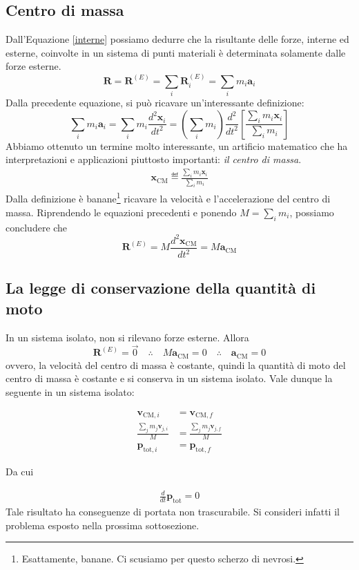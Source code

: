 \subsection{Centro di massa}
Dall'Equazione \ref{interne} possiamo dedurre che la risultante delle
forze, interne ed esterne, coinvolte in un sistema di punti materiali
è determinata solamente dalle forze esterne.
\[ \mathbf{R} = \mathbf{R}^{(E)} = \sum_{i} \mathbf{R}^{(E)}_i = \sum_i m_i\mathbf{a}_i \]
Dalla precedente equazione, si può ricavare un'interessante definizione:
\[ \sum_i m_i\mathbf{a}_i = \sum_i m_i \frac{d^2\mathbf{x}_i}{dt^2} = \left(\sum_i m_i\right) \frac{d^2}{dt^2}\left[ \frac{\sum_i m_i\mathbf{x}_i}{\sum_i m_i} \right] \]
Abbiamo ottenuto un termine molto interessante, un artificio matematico
che ha interpretazioni e applicazioni piuttosto importanti: \textit{il
centro di massa}.
\begin{align}
    \mathbf{x}_\text{CM} \eqdef \frac{\sum_i m_i\mathbf{x}_i}{\sum_i m_i}
\end{align}
Dalla definizione è banane\footnote{Esattamente, banane. Ci scusiamo per questo scherzo di nevrosi.} ricavare la velocità e l'accelerazione del
centro di massa. Riprendendo le equazioni precedenti e ponendo $M = \sum_i m_i$,
possiamo concludere che
\[ \mathbf{R}^{(E)} = M\frac{d^2\mathbf{x}_\text{CM}}{dt^2} = M\mathbf{a}_\text{CM} \]

\subsection{La legge di conservazione della quantità di moto}
In un sistema isolato, non si rilevano forze esterne. Allora
\[ \mathbf{R}^{(E)} = \overrightarrow{0} \quad \therefore \quad M\mathbf{a}_\text{CM} = 0 \quad \therefore \quad \mathbf{a}_\text{CM} = 0 \]
ovvero, la velocità del centro di massa è costante, quindi la
quantità di moto del centro di massa è costante e si conserva in
un sistema isolato. Vale dunque la seguente in un sistema isolato:

\begin{align*}
    \mathbf{v}_{\text{CM}, i} &= \mathbf{v}_{\text{CM}, f}\\
    \frac{\sum_j m_j\mathbf{v}_{j,i}}{M} &= \frac{\sum_j m_j\mathbf{v}_{j,f}}{M}\\
    \mathbf{p}_{\text{tot}, i} &= \mathbf{p}_{\text{tot}, f}
\end{align*}

\noindent Da cui

\begin{align}
    \frac{d}{dt}\mathbf{p}_\text{tot} = 0
\end{align}
Tale risultato ha conseguenze di portata non trascurabile. Si consideri
infatti il problema esposto nella prossima sottosezione.

